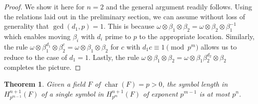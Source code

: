 \documentclass[preprint, 10pt, english]{elsarticle}
\newtheorem{thm}{Theorem}[section] %
\theoremstyle{definition}
\begin{document}
\begin{proof} We show it here for $n=2$ and the general argument readily follows. Using the relations laid out in the preliminary section, we can assume without loss of generality that $\gcd(d_1,p)=1$. This is  because $\omega \otimes \beta_1 \otimes \beta_2=\omega \otimes \beta_2 \otimes \beta_1^{-1}$ which enables moving $\beta_i$ with $d_i$ prime to $p$ to the appropriate location. Similarly, the rule $\omega\otimes \beta_1^{d_1} \otimes \beta_2^{c} = \omega \otimes \beta_1 \otimes \beta_2$ for $c$ with $d_1 c\equiv 1 \pmod{p^m}$ allows us to reduce to the case of $d_1=1$. Lastly, the rule $\omega \otimes \beta_1 \otimes \beta_2=\omega \otimes \beta_1 \beta_2^{d_2} \otimes \beta_2$ completes the picture.
\end{proof}

\begin{thm}\label{T3}
Given a field $F$ of $\operatorname{char}(F)=p>0$, the symbol length in $H_{p^{m-1}}^{n+1}(F)$ of a single symbol in $H_{p^m}^{n+1}(F)$ of exponent $p^{m-1}$ is at most $p^n$.
\end{thm}
\end{document}
